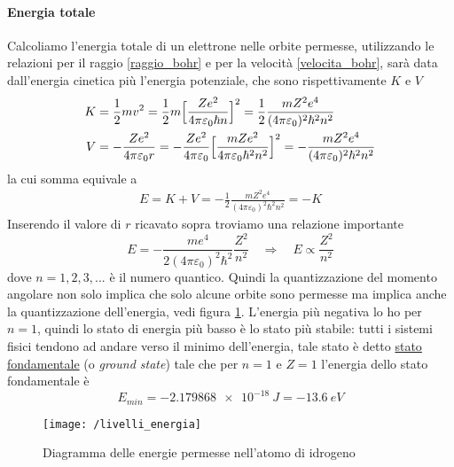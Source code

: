 \paragraph{Energia totale} Calcoliamo l'energia totale di un elettrone nelle orbite permesse, utilizzando le relazioni per il raggio \ref{raggio_bohr} e per la velocità \ref{velocita_bohr}, sarà data dall'energia cinetica più l'energia potenziale, che sono rispettivamente $K$ e $V$
\begin{equation}
\begin{split}
K & = \frac{ 1}{2 } m v^2 = \frac{ 1}{2 } m \Bigl[ \frac{ Z e^2}{4\pi \varepsilon_0 \hbar n } \Bigr]^2 = \frac{ 1}{2 } \frac{ m Z^2 e^4 }{(4\pi \varepsilon_0)^2 \hbar^2 n^2 } \\
V & = - \frac{ Z e^2}{4 \pi \varepsilon_0 r } = - \frac{ Z e^2}{4\pi \varepsilon_0 } \Bigl[ \frac{ m Z e^2}{4\pi \varepsilon_0 \hbar^2 n^2 } \Bigr]^2 = - \frac{ m Z^2 e^4}{(4\pi \varepsilon_0)^2 \hbar^2 n^2 }
\end{split}
\end{equation}
la cui somma equivale a
\begin{equation}
\begin{split}
E = K + V = - \frac{ 1}{2 } \frac{ m Z^2 e^4 }{(4\pi \varepsilon_0)^2 \hbar^2 n^2 } = - K
\end{split}
\end{equation}
Inserendo il valore di $r$ ricavato sopra troviamo una relazione importante
\begin{equation}
E = - \frac{ m e^4}{2 (4\pi \varepsilon_0)^2 \hbar^2 } \frac{ Z^2}{n^2 } \quad\Rightarrow\quad E \propto \frac{ Z^2}{n^2 }
\label{energia_quantizzata}
\end{equation}
dove $n=1,2,3,...$ è il numero quantico.
Quindi la quantizzazione del momento angolare non solo implica che solo alcune orbite sono permesse ma implica anche la quantizzazione dell'energia, vedi figura \ref{energie_permesse}.
L'energia più negativa lo ho per $n=1$, quindi lo stato di energia più basso è lo stato più stabile: tutti i sistemi fisici tendono ad andare verso il minimo dell'energia, tale stato è detto \underline{stato fondamentale} (o \textit{ground state})
tale che per $n=1$ e $Z=1$ l'energia dello stato fondamentale è
\begin{equation}
E_{min} = -\SI{2.179868e-18}{J} = - \SI{13.6}{eV}
\label{energia_fondamentale}
\end{equation}
\begin{figure}[h]
\centering
\texttt{[image: /livelli\_energia]}
\caption{Diagramma delle energie permesse nell'atomo di idrogeno}
\label{energie_permesse}
\end{figure}

